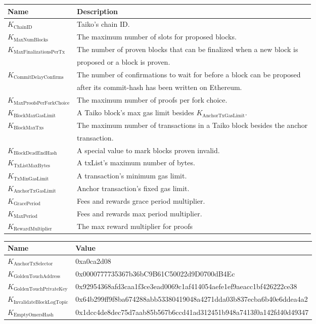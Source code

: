 \documentclass[9pt,oneside]{amsart}
\begin{document}
\begin{tabu}{l l}
\toprule
Name  & Description \\
\midrule
$K_{\mathrm{ChainID}}$ & Taiko's chain ID. \\
$K_{\mathrm{MaxNumBlocks}}$ & The maximum number of slots for proposed blocks. \\
$K_{\mathrm{MaxFinalizationsPerTx}}$  & The number of proven blocks that can be finalized when a new block is\\
& proposed or a block is proven. \\
$K_{\mathrm{CommitDelayConfirms}}$  & The number of confirmations to wait for before a block can be proposed\\
& after its commit-hash has been written on Ethereum.\\
$K_{\mathrm{MaxProofsPerForkChoice}}$ & The maximum number of proofs per fork choice. \\
$K_{\mathrm{BlockMaxGasLimit}}$  & A Taiko block's max gas limit besides $K_{\mathrm{AnchorTxGasLimit}}$.  \\
$K_{\mathrm{BlockMaxTxs}}$  & The maximum number of transactions in a Taiko block besides the anchor\\
&  transaction. \\
$K_{\mathrm{BlockDeadEndHash}}$ & A special value to mark blocks proven invalid. \\
$K_{\mathrm{TxListMaxBytes}}$  & A txList's maximum number of bytes. \\
$K_{\mathrm{TxMinGasLimit}}$  & A transaction's minimum gas limit. \\
$K_{\mathrm{AnchorTxGasLimit}}$  & Anchor transaction's fixed gas limit. \\
$K_{\mathrm{GracePeriod}}$  & Fees and rewards grace period multiplier. \\
$K_{\mathrm{MaxPeriod}}$ & Fees and rewards max period multiplier. \\
$K_{\mathrm{RewardMultiplier}}$ & The max reward multiplier for proofs \\
\bottomrule
\end{tabu}

\begin{tabu}{l l}
\toprule
Name &  \quad \quad Value \\
\midrule
$K_{\mathrm{AnchorTxSelector}}$ &  \quad \quad 0xa0ca2d08 \\
$K_{\mathrm{GoldenTouchAddress}}$ &  \quad \quad 0x0000777735367b36bC9B61C50022d9D0700dB4Ec  \\
$K_{\mathrm{GoldenTouchPrivateKey}}$ & \quad \quad 0x92954368afd3caa1f3ce3ead0069c1af414054aefe1ef9aeacc1bf426222ce38 \\
$K_{\mathrm{InvalidateBlockLogTopic}}$ & \quad \quad 0x64b299ff9f8ba674288abb53380419048a4271dda03b837ecba6b40e6ddea4a2 \\
$K_{\mathrm{EmptyOmersHash}}$ & \quad \quad 0x1dcc4de8dec75d7aab85b567b6ccd41ad312451b948a7413f0a142fd40d49347   \quad \quad \quad \quad \\
\bottomrule
\end{tabu}
\end{document}

